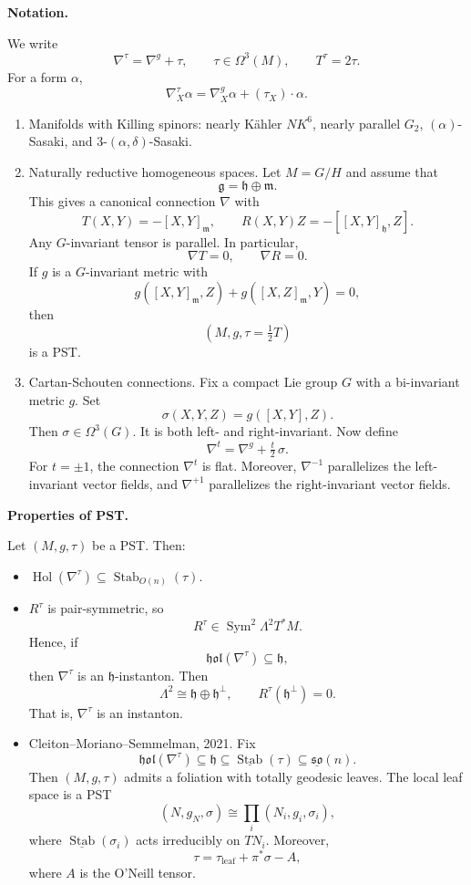 \medskip\noindent
{\bf Notation.}

We write
\[
\nabla^\tau=\nabla^g+\tau,
\qquad
\tau\in\Omega^3(M),
\qquad
T^\tau=2\tau.
\]
For a form $\alpha$,
\[
\nabla^\tau_X\alpha
=
\nabla^g_X\alpha
+(\tau_X)\cdot\alpha.
\]

\begin{example}
\label{example-manifolds-killing}
\begin{enumerate}
\item Manifolds with Killing spinors:
nearly K\"ahler $NK^6$,
nearly parallel $G_2$,
$(\alpha)$-Sasaki,
and $3$-$(\alpha,\delta)$-Sasaki.
\item Naturally reductive homogeneous
spaces.
Let $M=G/H$ and assume that
\[
\mathfrak g=\mathfrak h\oplus\mathfrak m.
\]
This gives a canonical connection
$\nabla$ with
\[
T(X,Y)=-[X,Y]_{\mathfrak m},
\qquad
R(X,Y)Z=
-[[X,Y]_{\mathfrak h},Z].
\]
Any $G$-invariant tensor is parallel.
In particular,
\[
\nabla T=0,
\qquad
\nabla R=0.
\]
If $g$ is a $G$-invariant metric with
\[
g([X,Y]_{\mathfrak m},Z)
+g([X,Z]_{\mathfrak m},Y)=0,
\]
then
\[
(M,g,\tau=\tfrac12T)
\]
is a PST.
\item Cartan-Schouten connections.
Fix a compact Lie group $G$
with a bi-invariant metric $g$.
Set
\[
\sigma(X,Y,Z)=g([X,Y],Z).
\]
Then $\sigma\in\Omega^3(G)$.
It is both left- and right-invariant.
Now define
\[
\nabla^t=\nabla^g+\tfrac t2\,\sigma.
\]
For $t=\pm1$, the connection
$\nabla^t$ is flat.
Moreover, $\nabla^{-1}$
parallelizes the left-invariant vector
fields, and $\nabla^{+1}$
parallelizes the right-invariant
vector fields.
\end{enumerate}
\end{example}

\medskip\noindent
{\bf Properties of PST.}

Let $(M,g,\tau)$ be a PST. Then:

\begin{itemize}
\item
$\operatorname{Hol}(\nabla^\tau)
\subseteq
\operatorname{Stab}_{O(n)}(\tau)$.
\item
$R^\tau$ is pair-symmetric, so
\[
R^\tau\in \operatorname{Sym}^2
\Lambda^2T^*M.
\]
Hence, if
\[
\mathfrak{hol}(\nabla^\tau)
\subseteq
\mathfrak h,
\]
then $\nabla^\tau$ is an
$\mathfrak h$-instanton.
Then
\[
\Lambda^2
\cong
\mathfrak h\oplus\mathfrak h^\perp,
\qquad
R^\tau(\mathfrak h^\perp)=0.
\]
That is, $\nabla^\tau$ is an instanton.
\item
Cleiton--Moriano--Semmelman, 2021.
Fix
\[
\mathfrak{hol}(\nabla^\tau)
\subseteq
\mathfrak h
\subseteq
\underline{\operatorname{Stab}}(\tau)
\subseteq
\underline{\mathfrak{so}}(n).
\]
Then $(M,g,\tau)$ admits a foliation
with totally geodesic leaves.
The local leaf space is a PST
\[
(N,g_N,\sigma)
\cong
\prod_i (N_i,g_i,\sigma_i),
\]
where
$\underline{\operatorname{Stab}}(\sigma_i)$
acts irreducibly on $T N_i$.
Moreover,
\[
\tau=\tau_{\mathrm{leaf}}
+\pi^*\sigma-A,
\]
where $A$ is the O'Neill tensor.
\end{itemize}


